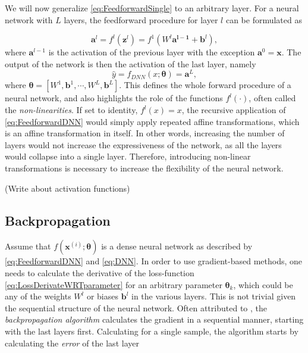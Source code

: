We will now generalize \autoref{eq:FeedforwardSingle} to an arbitrary layer. For a neural network with $L$ layers, the feedforward procedure for layer $l$  can be formulated as 

\begin{equation}\label{eq:FeedforwardDNN}
    \boldsymbol{a}^l = f^l(\boldsymbol{z}^l) = f^1(W^l \boldsymbol{a^{l-1}} + \boldsymbol{b}^l),
\end{equation}
where $\boldsymbol{a}^{l-1}$ is the activation of the previous layer with the exception $\boldsymbol{a}^{0} = \boldsymbol{x}$. The output of the network is then the activation of the last layer, namely 
\begin{equation}\label{eq:DNN}
    \hat{y} = f_{DNN}(x;\boldsymbol{\theta}) = \boldsymbol{a}^{L},
\end{equation}
where $\boldsymbol{\theta} = [W^1, \boldsymbol{b}^1, \cdots, W^L,  \boldsymbol{b}^L]$. This defines the whole forward procedure of a neural network, and also highlights the role of the functions $f^l(\cdot)$, often called the \emph{non-linearities}. If set to identity, $f^l(x) = x$, the recursive application of \autoref{eq:FeedforwardDNN} would simply apply repeated affine transformations, which is an affine transformation in itself. In other words, increasing the number of layers would not increase the expressiveness of the network, as all the layers would collapse into a single layer. Therefore, introducing non-linear transformations is necessary to increase the flexibility of the neural network. 

(Write about activation functions)

\subsection{Backpropagation}\label{sec:BackpropogationDNN}


Assume that $f(\boldsymbol{x}^{(i)}; \boldsymbol{\theta})$ is a dense neural network as described by \autoref{eq:FeedforwardDNN} and \autoref{eq:DNN}. In order to use gradient-based methods, one needs to calculate the derivative of the loss-function \autoref{eq:LossDerivateWRTparameter} for an arbitrary parameter $\boldsymbol{\theta}_k$, which could be any of the weights $W^l$ or biases $\boldsymbol{b}^l$ in the various layers. This is not trivial given the sequential structure of the neural network. Often attributed to \citet{Rumelhart}, the \emph{backpropagation algorithm} calculates the gradient in a sequential manner, starting with the last layers first. Calculating for a single sample, the algorithm starts by calculating the \emph{error} of the last layer


